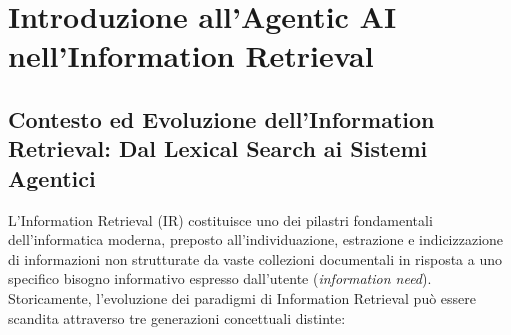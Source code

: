 \chapter{Introduzione all'Agentic AI nell'Information Retrieval}
\label{chap:introduzione}

\section{Contesto ed Evoluzione dell'Information Retrieval: Dal Lexical Search ai Sistemi Agentici}
\label{sec:contesto_evoluzione}

L'Information Retrieval (IR) costituisce uno dei pilastri fondamentali dell'informatica moderna, preposto all'individuazione, estrazione e indicizzazione di informazioni non strutturate da vaste collezioni documentali in risposta a uno specifico bisogno informativo espresso dall'utente (\textit{information need}). Storicamente, l'evoluzione dei paradigmi di Information Retrieval può essere scandita attraverso tre generazioni concettuali distinte:
